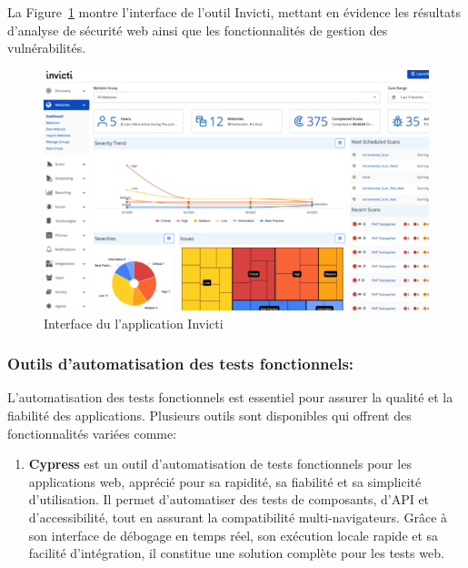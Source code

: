 \begin{justify}
\begin{enumerate}[label=\alph*)]
            La Figure~\ref{fig:Invicti} montre l’interface de l’outil Invicti, mettant en évidence les résultats d’analyse de sécurité web ainsi que les fonctionnalités de gestion des vulnérabilités.
            \begin{figure}[H]
                \centering
               \includegraphics[width=\textwidth]{chapitres/ch1/img/existant/invicti.png}
                \caption{Interface du l’application Invicti\cite{invicti}}
                \label{fig:Invicti}
            \end{figure}
            \vspace*{-0.4cm}
        \end{enumerate}
    \subsubsection{Outils d’automatisation des tests fonctionnels:}
        L’automatisation des tests fonctionnels est essentiel pour assurer la qualité et la fiabilité des applications. Plusieurs outils sont disponibles qui offrent des fonctionnalités variées comme:
        \begin{enumerate}[label=\alph*)]
           \item  \textbf{Cypress}\cite{Cypress} est un outil d'automatisation de tests fonctionnels pour les applications web, apprécié pour sa rapidité, sa fiabilité et sa simplicité d'utilisation. Il permet d’automatiser des tests de composants, d’API et d’accessibilité, tout en assurant la compatibilité multi-navigateurs. Grâce à son interface de débogage en temps réel, son exécution locale rapide et sa facilité d’intégration, il constitue une solution complète pour les tests web.


\end{enumerate}
\end{justify}
